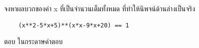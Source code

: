\question จงหาผลบวกของค่า x ที่เป็นจำนวนเต็มทั้งหมด ที่ทำให้นิพจน์ด้านล่างเป็นจริง
\begin{verbatim}
    (x**2-5*x+5)**(x*x-9*x+20) == 1
\end{verbatim}

\par\medskip
ตอบ ในกระดาษคำตอบ
